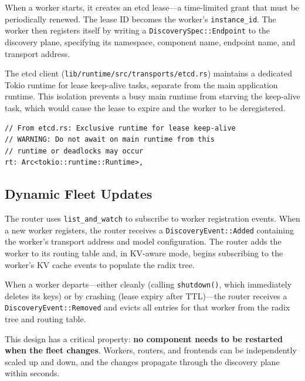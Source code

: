 When a worker starts, it creates an etcd lease---a time-limited grant that must be periodically renewed. The lease ID becomes the worker's \texttt{instance\_id}. The worker then registers itself by writing a \texttt{DiscoverySpec::Endpoint} to the discovery plane, specifying its namespace, component name, endpoint name, and transport address.

%

The etcd client (\texttt{lib/runtime/src/transports/etcd.rs}) maintains a dedicated Tokio runtime for lease keep-alive tasks, separate from the main application runtime. This isolation prevents a busy main runtime from starving the keep-alive task, which would cause the lease to expire and the worker to be deregistered.

\begin{verbatim}
// From etcd.rs: Exclusive runtime for lease keep-alive
// WARNING: Do not await on main runtime from this
// runtime or deadlocks may occur
rt: Arc<tokio::runtime::Runtime>,
\end{verbatim}

\subsection{Dynamic Fleet Updates}

The router uses \texttt{list\_and\_watch} to subscribe to worker registration events. When a new worker registers, the router receives a \texttt{DiscoveryEvent::Added} containing the worker's transport address and model configuration. The router adds the worker to its routing table and, in KV-aware mode, begins subscribing to the worker's KV cache events to populate the radix tree.

When a worker departs---either cleanly (calling \texttt{shutdown()}, which immediately deletes its keys) or by crashing (lease expiry after TTL)---the router receives a \texttt{DiscoveryEvent::Removed} and evicts all entries for that worker from the radix tree and routing table.

This design has a critical property: \textbf{no component needs to be restarted when the fleet changes}. Workers, routers, and frontends can be independently scaled up and down, and the changes propagate through the discovery plane within seconds.

